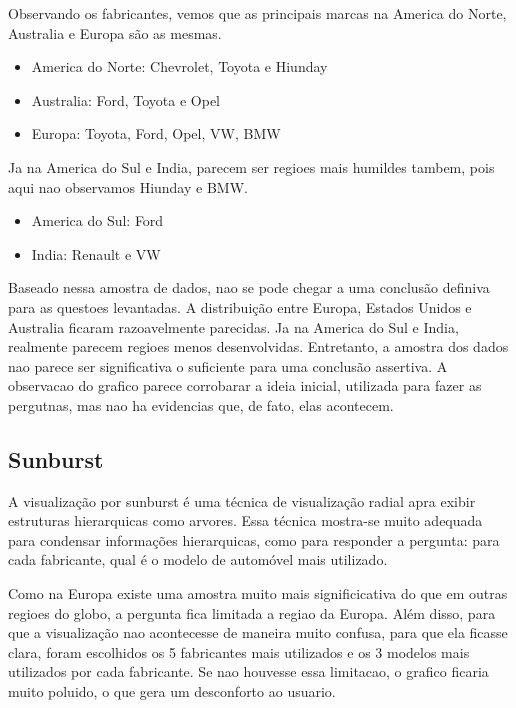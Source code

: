 \documentclass[10pt, conference]{IEEEtran}
\begin{document}
Observando os fabricantes, vemos que as principais marcas na America do Norte, Australia e Europa
são as mesmas.

\begin{itemize}
  \item America do Norte: Chevrolet, Toyota e Hiunday
  \item Australia: Ford, Toyota e Opel
  \item Europa: Toyota, Ford, Opel, VW, BMW
\end{itemize}

Ja na America do Sul e India, parecem ser regioes mais humildes tambem, pois aqui nao observamos
Hiunday e BMW.

\begin{itemize}
  \item America do Sul: Ford
  \item India: Renault e VW
\end{itemize}

Baseado nessa amostra de dados, nao se pode chegar a uma conclusão definiva para as
questoes levantadas. A distribuição entre Europa, Estados Unidos e Australia ficaram razoavelmente
parecidas. Ja na America do Sul e India, realmente parecem regioes menos desenvolvidas. Entretanto,
a amostra dos dados nao parece ser significativa o suficiente para uma conclusão assertiva. A observacao
do grafico parece corrobarar a ideia inicial, utilizada para fazer as pergutnas, mas nao ha evidencias
que, de fato, elas acontecem.



\subsection{Sunburst}

A visualização por sunburst é uma técnica de visualização radial apra exibir estruturas hierarquicas
como arvores. Essa técnica mostra-se muito adequada para condensar informações hierarquicas, 
como para responder a pergunta:
para cada fabricante, qual é o modelo de automóvel mais utilizado. 

Como na Europa existe uma amostra muito mais significicativa do que em outras regioes do globo, a
pergunta fica limitada a regiao da Europa. Além disso, para que a visualização nao acontecesse de maneira
muito confusa, para que ela ficasse clara, foram escolhidos os 5 fabricantes mais utilizados e os 3 modelos
mais utilizados por cada fabricante. Se nao houvesse essa limitacao, o grafico ficaria muito poluido, o que
gera um desconforto ao usuario.
\end{document}
